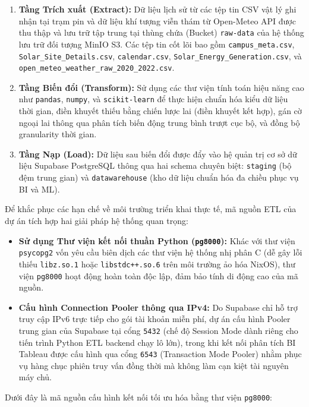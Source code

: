 \documentclass[12pt, a4paper]{report}
\begin{document}
\begin{enumerate}[noitemsep]
    \item \textbf{Tầng Trích xuất (Extract):} Dữ liệu lịch sử từ các tệp tin CSV vật lý ghi nhận tại trạm pin và dữ liệu khí tượng viễn thám từ Open-Meteo API được thu thập và lưu trữ tập trung tại thùng chứa (Bucket) \texttt{raw-data} của hệ thống lưu trữ đối tượng MinIO S3. Các tệp tin cốt lõi bao gồm \texttt{campus\_meta.csv}, \texttt{Solar\_Site\_Details.csv}, \texttt{calendar.csv}, \texttt{Solar\_Energy\_Generation.csv}, và \texttt{open\_meteo\_weather\_raw\_2020\_2022.csv}.
    \item \textbf{Tầng Biến đổi (Transform):} Sử dụng các thư viện tính toán hiệu năng cao như \texttt{pandas}, \texttt{numpy}, và \texttt{scikit-learn} để thực hiện chuẩn hóa kiểu dữ liệu thời gian, điền khuyết thiếu bằng chiến lược lai (điền khuyết kết hợp), gán cờ ngoại lai thông qua phân tích biến động trung bình trượt cục bộ, và đồng bộ granularity thời gian.
    \item \textbf{Tầng Nạp (Load):} Dữ liệu sau biến đổi được đẩy vào hệ quản trị cơ sở dữ liệu Supabase PostgreSQL thông qua hai schema chuyên biệt: \texttt{staging} (bộ đệm trung gian) và \texttt{datawarehouse} (kho dữ liệu chuẩn hóa đa chiều phục vụ BI và ML).
\end{enumerate}

Để khắc phục các hạn chế về môi trường triển khai thực tế, mã nguồn ETL của dự án tích hợp hai giải pháp hệ thống quan trọng:
\begin{itemize}
    \item \textbf{Sử dụng Thư viện kết nối thuần Python (\texttt{pg8000}):} Khác với thư viện \texttt{psycopg2} vốn yêu cầu biên dịch các thư viện hệ thống nhị phân C (dễ gây lỗi thiếu \texttt{libz.so.1} hoặc \texttt{libstdc++.so.6} trên môi trường ảo hóa NixOS), thư viện \texttt{pg8000} hoạt động hoàn toàn độc lập, đảm bảo tính di động cao của mã nguồn.
    \item \textbf{Cấu hình Connection Pooler thông qua IPv4:} Do Supabase chỉ hỗ trợ truy cập IPv6 trực tiếp cho gói tài khoản miễn phí, dự án cấu hình Pooler trung gian của Supabase tại cổng \texttt{5432} (chế độ Session Mode dành riêng cho tiến trình Python ETL backend chạy lô lớn), trong khi kết nối phân tích BI Tableau được cấu hình qua cổng \texttt{6543} (Transaction Mode Pooler) nhằm phục vụ hàng chục phiên truy vấn đồng thời mà không làm cạn kiệt tài nguyên máy chủ.
\end{itemize}
\newpage
Dưới đây là mã nguồn cấu hình kết nối tối ưu hóa bằng thư viện \texttt{pg8000}:
\end{document}
